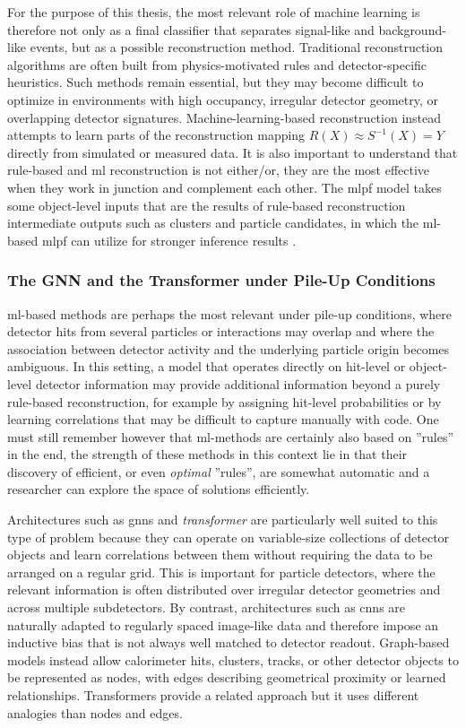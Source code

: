 For the purpose of this thesis, the most relevant role of machine learning is therefore not only as a final classifier that separates signal-like and background-like events, but as a possible reconstruction method. Traditional reconstruction algorithms are often built from physics-motivated rules and detector-specific heuristics. Such methods remain essential, but they may become difficult to optimize in environments with high occupancy, irregular detector geometry, or overlapping detector signatures. Machine-learning-based reconstruction instead attempts to learn parts of the reconstruction mapping $R(X) \approx S^{-1}(X) = Y$ directly from simulated or measured data. It is also important to understand that rule-based and \gls{ml} reconstruction is not either/or, they are the most effective when they work in junction and complement each other. The \gls{mlpf} model takes some object-level inputs that are the results of rule-based reconstruction intermediate outputs such as clusters and particle candidates, in which the \gls{ml}-based \gls{mlpf} can utilize for stronger inference results \cite{pata2021-mlpf}. 

\subsubsection{The GNN and the Transformer under Pile-Up Conditions}

\gls{ml}-based methods are perhaps the most relevant under pile-up conditions, where detector hits from several particles or interactions may overlap and where the association between detector activity and the underlying particle origin becomes ambiguous. In this setting, a model that operates directly on hit-level or object-level detector information may provide additional information beyond a purely rule-based reconstruction, for example by assigning hit-level probabilities or by learning correlations that may be difficult to capture manually with code. One must still remember however that \gls{ml}-methods are certainly also based on ''rules'' in the end, the strength of these methods in this context lie in that their discovery of efficient, or even \textit{optimal} ''rules'', are somewhat automatic and a researcher can explore the space of solutions efficiently.

Architectures such as \glspl{gnn} and \textit{transformer} are particularly well suited to this type of problem because they can operate on variable-size collections of detector objects and learn correlations between them without requiring the data to be arranged on a regular grid. This is important for particle detectors, where the relevant information is often distributed over irregular detector geometries and across multiple subdetectors. By contrast, architectures such as \glspl{cnn} are naturally adapted to regularly spaced image-like data and therefore impose an inductive bias that is not always well matched to detector readout. Graph-based models instead allow calorimeter hits, clusters, tracks, or other detector objects to be represented as nodes, with edges describing geometrical proximity or learned relationships. Transformers provide a related approach but it uses different analogies than nodes and edges. 

